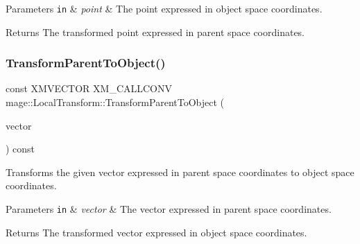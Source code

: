 \begin{DoxyParams}[1]{Parameters}
\mbox{\tt in}  & {\em point} & The point expressed in object space coordinates. \\
\hline
\end{DoxyParams}
\begin{DoxyReturn}{Returns}
The transformed point expressed in parent space coordinates. 
\end{DoxyReturn}
\mbox{\label{classmage_1_1_local_transform_aee4c8c7b54e538a1448224bb36490d0a}} 
\subsubsection{\texorpdfstring{Transform\+Parent\+To\+Object()}{TransformParentToObject()}}
{\footnotesize\ttfamily const X\+M\+V\+E\+C\+T\+OR X\+M\+\_\+\+C\+A\+L\+L\+C\+O\+NV mage\+::\+Local\+Transform\+::\+Transform\+Parent\+To\+Object (\begin{DoxyParamCaption}\item[{F\+X\+M\+V\+E\+C\+T\+OR}]{vector }\end{DoxyParamCaption}) const\hspace{0.3cm}{\ttfamily [noexcept]}}

Transforms the given vector expressed in parent space coordinates to object space coordinates.


\begin{DoxyParams}[1]{Parameters}
\mbox{\tt in}  & {\em vector} & The vector expressed in parent space coordinates. \\
\hline
\end{DoxyParams}
\begin{DoxyReturn}{Returns}
The transformed vector expressed in object space coordinates. 
\end{DoxyReturn}
\mbox{\label{classmage_1_1_local_transform_a237b0811672ffc8dd611e6a56af24c18}} 
